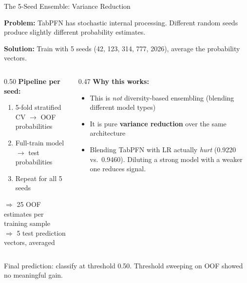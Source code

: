 \documentclass[aspectratio=169, 11pt]{beamer}
\begin{document}
\begin{frame}{The 5-Seed Ensemble: Variance Reduction}

\textbf{Problem:} TabPFN has stochastic internal processing. Different random seeds produce slightly different probability estimates.

\vspace{0.3em}
\textbf{Solution:} Train with 5 seeds (42, 123, 314, 777, 2026), average the probability vectors.

\vspace{0.3em}
\begin{columns}[T]
\begin{column}{0.50\textwidth}
  \textbf{Pipeline per seed:}
  \begin{enumerate}
    \item 5-fold stratified CV $\to$ OOF probabilities
    \item Full-train model $\to$ test probabilities
    \item Repeat for all 5 seeds
  \end{enumerate}
  $\Rightarrow$ 25 OOF estimates per training sample\\
  $\Rightarrow$ 5 test prediction vectors, averaged
\end{column}
\begin{column}{0.47\textwidth}
  \textbf{Why this works:}
  \begin{itemize}
    \item This is \textit{not} diversity-based ensembling (blending different model types)
    \item It is pure \textbf{variance reduction} over the same architecture
    \item Blending TabPFN with LR actually \textit{hurt} (0.9220 vs.\ 0.9460). Diluting a strong model with a weaker one reduces signal.
  \end{itemize}
\end{column}
\end{columns}

\vspace{0.5em}
\centering
Final prediction: classify at threshold 0.50. Threshold sweeping on OOF showed no meaningful gain.
\end{frame}
\end{document}
